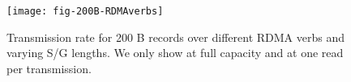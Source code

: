 \begin{figure}[H]
\texttt{[image: fig-200B-RDMAverbs]}
\caption{Transmission rate for 200 B records over different RDMA verbs and 
varying S/G lengths. We only show  at full capacity and  at one read per transmission.}
\label{fig:200B_transrate}
\end{figure}
